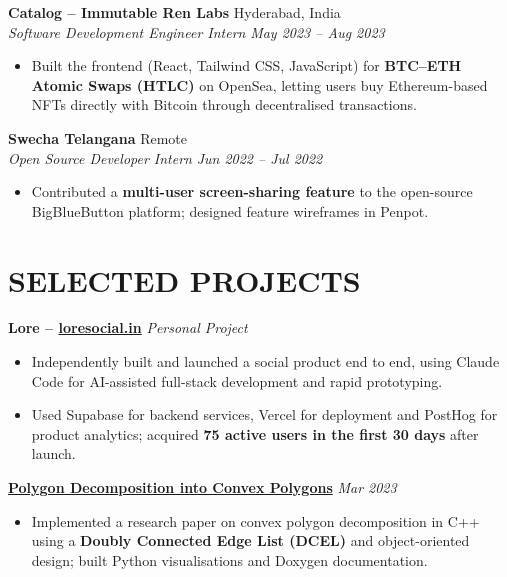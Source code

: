 \documentclass[a4paper,10pt]{extarticle}
\newcommand{\resumeSubheading}[4]{%
    \textbf{#1} \hfill #2\\
    \textit{#3} \hfill \textit{#4}}
\newcommand{\projectHeading}[2]{\textbf{#1} \hfill \textit{#2}}
\begin{document}
\vspace{3pt}
\resumeSubheading
{Catalog -- Immutable Ren Labs}
{Hyderabad, India}
{Software Development Engineer Intern}
{May 2023 -- Aug 2023}

\begin{itemize}
    \item Built the frontend (React, Tailwind CSS, JavaScript) for \textbf{BTC--ETH Atomic Swaps
    (HTLC)} on OpenSea, letting users buy Ethereum-based NFTs directly with Bitcoin through
    decentralised transactions.
\end{itemize}

\vspace{3pt}
\resumeSubheading
{Swecha Telangana}
{Remote}
{Open Source Developer Intern}
{Jun 2022 -- Jul 2022}

\begin{itemize}
    \item Contributed a \textbf{multi-user screen-sharing feature} to the open-source
    BigBlueButton platform; designed feature wireframes in Penpot.
\end{itemize}

\section*{SELECTED PROJECTS}

\projectHeading
{Lore -- \href{https://loresocial.in}{loresocial.in}}
{Personal Project}

\begin{itemize}
    \item Independently built and launched a social product end to end, using Claude Code for
    AI-assisted full-stack development and rapid prototyping.

    \item Used Supabase for backend services, Vercel for deployment and PostHog for product
    analytics; acquired \textbf{75 active users in the first 30 days} after launch.
\end{itemize}

\vspace{3pt}
\projectHeading
{\href{https://github.com/shivansh-13/Polygon-Decomposition-into-Convex-Polygon-DAA-}{Polygon Decomposition into Convex Polygons}}
{Mar 2023}

\begin{itemize}
    \item Implemented a research paper on convex polygon decomposition in C++ using a
    \textbf{Doubly Connected Edge List (DCEL)} and object-oriented design; built Python
    visualisations and Doxygen documentation.
\end{itemize}
\end{document}
